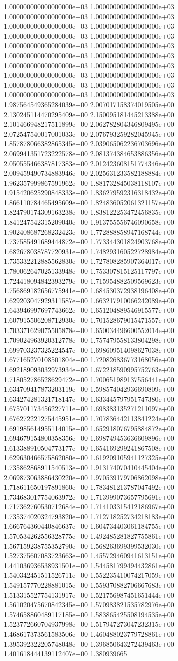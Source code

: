 1.000000000000000000e+03	1.000000000000000000e+03	1.000000000000000000e+03	1.000000000000000000e+03	1.000000000000000000e+03	1.000000000000000000e+03	1.000000000000000000e+03	1.000000000000000000e+03	1.000000000000000000e+03	1.000000000000000000e+03	1.000000000000000000e+03	1.000000000000000000e+03	1.000000000000000000e+03	1.000000000000000000e+03	1.000000000000000000e+03	1.000000000000000000e+03	1.000000000000000000e+03	1.000000000000000000e+03	1.000000000000000000e+03	1.000000000000000000e+03	1.987564549365284039e+00	2.007017158374019505e+00	2.130245114470295409e+00	2.150095181445213388e+00	2.101466948217511899e+00	2.062782804346809495e+00	2.072547540017001033e+00	2.076793259282045945e+00	1.857878066382865345e+00	2.039065062236703696e+00	2.069941351723222578e+00	2.081374384653886356e+00	2.050555466387817383e+00	2.012423608151774346e+00	2.009459490734883946e+00	2.025631233582188884e+00	1.962357999867591962e+00	1.881732845038118107e+00	1.915420625290848333e+00	1.836279592316318432e+00	1.866110784465495609e+00	1.824836052061321157e+00	1.824790174309163238e+00	1.838122253472456835e+00	1.841247542315209040e+00	1.913755556746090658e+00	1.902408687268232423e+00	1.772888858947168744e+00	1.737585491689444872e+00	1.773344301824903768e+00	1.682678038787720931e+00	1.748293160522728984e+00	1.735332212885562830e+00	1.727808285907364017e+00	1.780062647025133948e+00	1.753307815125117797e+00	1.724418094842393279e+00	1.715954882509569623e+00	1.756869182656775941e+00	1.684530372938196408e+00	1.629203047929311587e+00	1.663217910066242089e+00	1.643946997697743662e+00	1.651204889546915577e+00	1.607915506208712930e+00	1.701528679015471557e+00	1.703371629075505878e+00	1.650034496600552014e+00	1.709024963920312778e+00	1.757479558133804298e+00	1.699703237325224547e+00	1.698609514098627038e+00	1.677165270108501804e+00	1.720826836773168056e+00	1.692189093032973934e+00	1.672218590995752763e+00	1.718052786528629472e+00	1.700651989137556441e+00	1.634709417873203119e+00	1.598574042936690809e+00	1.634274281321718147e+00	1.633445797951747380e+00	1.675701173456227711e+00	1.698383135271211097e+00	1.676272221275445951e+00	1.707836442113841224e+00	1.691985614955114015e+00	1.652918076795884872e+00	1.694679154800358356e+00	1.698749453636609896e+00	1.613388910504773177e+00	1.654169299241867508e+00	1.629630466575862080e+00	1.619209105941127325e+00	1.735862868911540513e+00	1.913174070410445404e+00	2.069873063886430220e+00	1.970539179706862098e+00	1.718611650197891860e+00	1.783481213787047492e+00	1.734683017754063972e+00	1.713999073657795691e+00	1.717362760530712684e+00	1.714103315412186967e+00	1.735374020324793820e+00	1.712718252734218183e+00	1.666764360440846637e+00	1.604734403061184755e+00	1.570534262556328775e+00	1.492485281827755861e+00	1.567159238755352790e+00	1.568263699399532030e+00	1.527375607083723663e+00	1.455729460941613151e+00	1.441036936538931501e+00	1.544581799494432861e+00	1.540342451511526711e+00	1.552235410074217059e+00	1.549157770228881015e+00	1.559370882706667683e+00	1.513315527754131917e+00	1.521756987451651444e+00	1.561020475670842345e+00	1.570983821535782976e+00	1.574658860489117185e+00	1.583865425508194535e+00	1.523772660704937998e+00	1.517947273047232315e+00	1.468617373561583506e+00	1.460488023779728861e+00	1.395392322205748048e+00	1.396850643272439463e+00	1.401618444139112407e+00	1.380939665